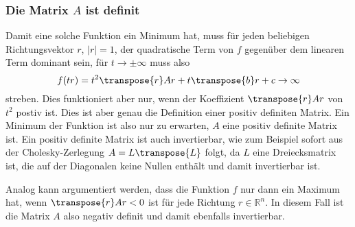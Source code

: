 \subsubsection{Die Matrix $A$ ist definit}
Damit eine solche Funktion ein Minimum hat, muss für jeden beliebigen
Richtungsvektor $r$, $|r|=1$, der quadratische Term von $f$ gegenüber dem
linearen Term dominant sein, für $t\to\pm\infty$ muss also
\[
f(tr)
=
t^2
\transpose{r}Ar
+
t
\transpose{b}r
+
c
\to \infty
\]
streben.
Dies funktioniert aber nur, wenn der Koeffizient $\transpose{r}Ar$ von
$t^2$ postiv ist.
Dies ist aber genau die Definition einer positiv definiten Matrix.
Ein Minimum der Funktion ist also nur zu erwarten, $A$ eine positiv
definite Matrix ist.
Ein positiv definite Matrix ist auch invertierbar, wie zum Beispiel
sofort aus der Cholesky-Zerlegung $A=L\transpose{L}$ folgt, da $L$
eine Dreiecksmatrix ist, die auf der Diagonalen keine Nullen enthält
und damit invertierbar ist.

Analog kann argumentiert werden, dass die Funktion $f$ nur dann
ein Maximum hat, wenn $\transpose{r}Ar<0$ ist für jede Richtung
$r\in\mathbb{R}^n$.
In diesem Fall ist die Matrix $A$ also negativ definit und damit
ebenfalls invertierbar.


%
%
